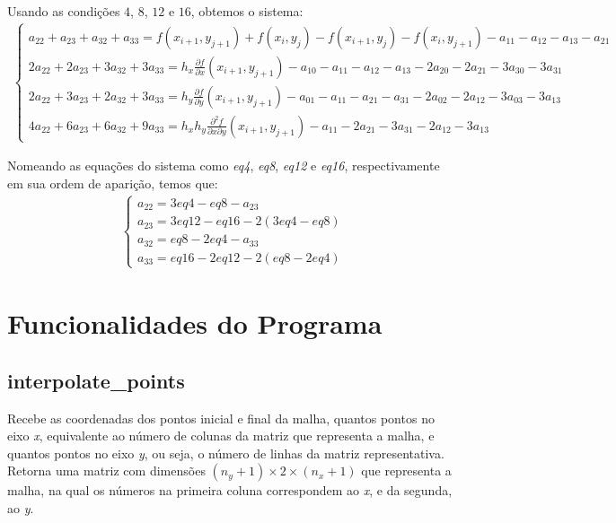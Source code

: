\documentclass[a4paper, 12pt]{article}
\begin{document}
Usando as condições $4$, $8$, $12$ e $16$, obtemos o sistema:
\begin{align*}
    \begin{cases}
    a_{22} + a_{23} + a_{32} + a_{33} = f(x_{i+1}, y_{j+1}) + f(x_i, y_j) - f(x_{i+1}, y_j) - f(x_i, y_{j+1}) - a_{11} - a_{12} - a_{13} - a_{21} \\
    2a_{22} + 2a_{23} + 3a_{32} + 3a_{33} = h_x\frac{\partial f}{\partial x}(x_{i+1}, y_{j+1}) - a_{10} - a_{11} - a_{12} - a_{13} - 2a_{20} - 2a_{21} - 3a_{30} - 3a_{31} \\
    2a_{22} + 3a_{23} + 2a_{32} + 3a_{33} = h_y\frac{\partial f}{\partial y}(x_{i+1}, y_{j+1}) - a_{01} - a_{11} - a_{21} - a_{31} - 2a_{02} - 2a_{12} - 3a_{03} - 3a_{13} \\
    4a_{22} + 6a_{23} + 6a_{32} + 9a_{33} = h_x h_y \frac{\partial^2 f}{\partial x \partial y}(x_{i+1}, y_{j+1}) - a_{11} - 2a_{21} - 3a_{31} - 2a_{12} - 3a_{13}
    \end{cases}
\end{align*}

Nomeando as equações do sistema como \textit{eq4}, \textit{eq8}, \textit{eq12} e \textit{eq16}, respectivamente em sua ordem de aparição, temos que:
\begin{align*}
    \begin{cases}
    a_{22} = 3eq4 - eq8 - a_{23} \\
    a_{23} = 3eq12 - eq16 - 2(3eq4 - eq8)\\
    a_{32} =  eq8 - 2eq4 - a_{33}\\
    a_{33} = eq16 - 2eq12 - 2(eq8 - 2eq4)
    \end{cases}
\end{align*}

\section*{Funcionalidades do Programa}
\subsection*{interpolate\_points}
    Recebe as coordenadas dos pontos inicial e final da malha, quantos pontos no eixo \textit{x}, equivalente ao número de colunas da matriz que representa a malha, e quantos pontos no eixo \textit{y}, ou seja, o número de linhas da matriz representativa. Retorna uma matriz com dimensões $(n_y + 1) \times 2 \times (n_x + 1)$ que representa a malha, na qual os números na primeira coluna correspondem ao \textit{x}, e da segunda, ao \textit{y}.
\end{document}
